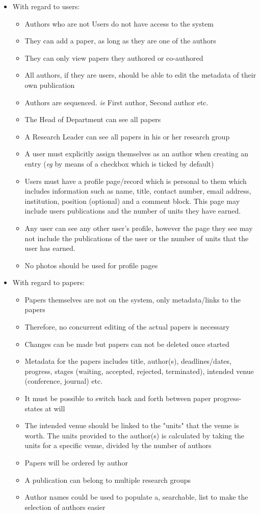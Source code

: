 \documentclass[a4paper,12pt]{article}
\begin{document}
\begin{itemize}
\item With regard to users:
\begin{itemize}
\item Authors who are not Users do not have access to the system
\item They can add a paper, as long as they are one of the authors
\item They can only view papers they authored or co-authored
\item All authors, if they are users, should be able to edit the metadata of their own publication
\item Authors are sequenced. \textit{ie} First author, Second author etc.  
\item The Head of Department can see all papers
\item A Research Leader can see all papers in his or her research group
\item A user must explicitly assign themselves as an author when creating an entry (\textit{eg} by means of a checkbox which is ticked by default)
\item Users must have a profile page/record which is personal to them which includes information such as name, 
title, contact number, email address, institution, position (optional) and a comment block. This page may include users publications and the number of units they have earned. 
\item Any user can see any other user's profile, however the page they see may not include the publications of the user or the number of units that the user has earned.
\item No photos should be used for profile pages
\end{itemize}

\item With regard to papers:
\begin{itemize}
\item Papers themselves are not on the system, only metadata/links to the papers
\item Therefore, no concurrent editing of the actual papers is necessary
\item Changes can be made but papers can not be deleted once started 
\item Metadata for the papers includes title, author(s), deadlines/dates, progress, stages (waiting, accepted, rejected, terminated), intended venue (conference, journal) etc.
\item It must be possible to switch back and forth between paper progress-states at will
\item The intended venue should be linked to the "units" that the venue is worth. The units provided to the author(s) is calculated by taking the units for a specific venue, divided by the number of authors
\item Papers will be ordered by author
\item A publication can belong to multiple research groups
\item Author names could be used to populate a, searchable, list to make the selection of authors easier
\end{itemize}


\end{itemize}
\end{document}
